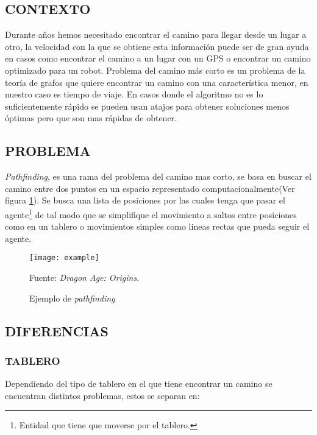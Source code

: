 
\subsection{CONTEXTO}

Durante años hemos necesitado encontrar el camino para llegar desde un lugar a otro, la velocidad con la que se obtiene esta información puede ser de gran ayuda en casos como encontrar el camino a un lugar con un GPS o encontrar un camino optimizado para un robot.
Problema del camino más corto es un problema de la teoría de grafos que quiere encontrar un camino con una característica menor, en nuestro caso es tiempo de viaje.
En casos donde el algoritmo no es lo suficientemente rápido se pueden usan atajos para obtener soluciones menos óptimas pero que son mas rápidas de obtener.

\subsection{PROBLEMA}

\textit{Pathfinding}, es una rama del problema del camino mas corto, se basa en buscar el camino entre dos puntos en un espacio representado computacionalmente(Ver figura \ref{fig:example}). Se busca una lista de posiciones por las cuales tenga que pasar el agente\footnote{Entidad que tiene que moverse por el tablero.} de tal modo que se simplifique el movimiento a saltos entre posiciones como en un tablero o movimientos simples como lineas rectas que pueda seguir el agente.

\begin{figure}[h]
\centering
\texttt{[image: example]}
\caption{\label{fig:example} Ejemplo de \textit{pathfinding}} Fuente: \textit{Dragon Age: Origins}\cite{bioware2009pathfinding}.
\end{figure}

\subsection{DIFERENCIAS}

\subsubsection{TABLERO}

Dependiendo del tipo de tablero en el que tiene encontrar un camino se encuentran distintos problemas, estos se separan en:

